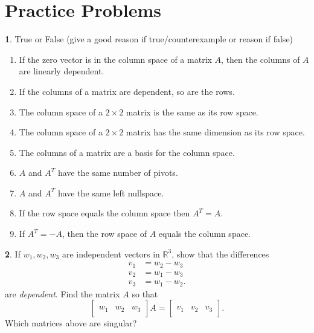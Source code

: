 \documentclass{article}
\theoremstyle{definition}
\newtheorem{prob}{}
\begin{document}
\section*{Practice Problems}
\begin{prob} True or False (give a good reason if true/counterexample or reason if false)

\begin{enumerate}
	
	\item If the zero vector is in the column space of a matrix $A$, then the columns of $A$ are linearly dependent.
	
	\item If the columns of a matrix are dependent, so are the rows.
	
	\item The column space of a $2 \times 2$ matrix is the same as its row space.
	
	\item The column space of a $2 \times 2$ matrix has the same dimension as its row space.
	
	\item The columns of a matrix are a basis for the column space.
	
	\item $A$ and $A^T$ have the same number of pivots.
	
	\item $A$ and $A^T$ have the same left nullspace.
	
	\item If the row space equals the column space then $A^T=A$.
	
	\item If $A^T = -A$, then the row space of $A$ equals the column space.
	
\end{enumerate}
	
\end{prob}

\begin{prob} If $w_1, w_2, w_3$ are independent vectors in $\mathbb{R}^3$, show that the differences 
\begin{align*}
	v_1 &= w_2 - w_3 \\
	v_2 &= w_1 - w_3 \\
	v_3 &= w_1 - w_2.
\end{align*}
are \emph{dependent}.  Find the matrix $A$ so that
\[ \begin{bmatrix} \\ w_1 & w_2 & w_3 \\ &\end{bmatrix}A = \begin{bmatrix} \\ v_1 & v_2 & v_3 \\ &\end{bmatrix}.\]
Which matrices above are singular?
\end{prob}
\end{document}
